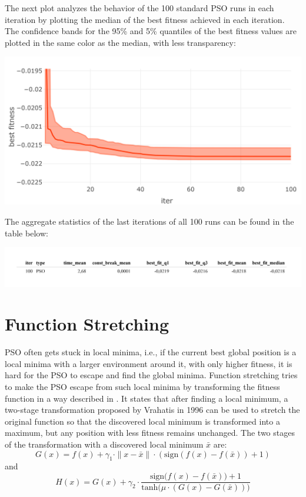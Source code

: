 \documentclass[
  oneside]{book}
\begin{document}
The next plot analyzes the behavior of the 100 standard PSO runs in each iteration by plotting the median of the best fitness achieved in each iteration. The confidence bands for the 95\% and 5\% quantiles of the best fitness values are plotted in the same color as the median, with less transparency:

\includegraphics{Master_Thesis_files/figure-latex/variants1-1.png}

The aggregate statistics of the last iterations of all 100 runs can be found in the table below:

\includegraphics{Master_Thesis_files/figure-latex/variants2-1.png}

\hypertarget{function-stretching}{%
\section{Function Stretching}\label{function-stretching}}

PSO often gets stuck in local minima, i.e., if the current best global position is a local minima with a larger environment around it, with only higher fitness, it is hard for the PSO to escape and find the global minima. Function stretching tries to make the PSO escape from such local minima by transforming the fitness function in a way described in \citep{PaVr2002}. It states that after finding a local minimum, a two-stage transformation proposed by Vrahatis in 1996 can be used to stretch the original function so that the discovered local minimum is transformed into a maximum, but any position with less fitness remains unchanged. The two stages of the transformation with a discovered local minimum \(\bar{x}\) are:
\begin{equation} 
G(x) = f(x) +  \gamma_1 \cdot \| x-\bar{x} \| \cdot (\text{sign}(f(x)-f(\bar{x}))+1)
\label{eq:fnstretchG}
\end{equation}
and
\begin{equation} 
  H(x) = G(x) + \gamma_2 \cdot \frac{\text{sign}\biggl(f(x)-f(\bar{x})\biggr)+1}{\text{tanh}\biggl( \mu \cdot (G(x)-G(\bar{x})) \biggr)}
\label{eq:fnstretchH}
\end{equation}
\end{document}
